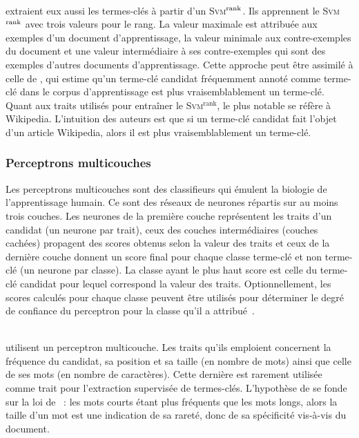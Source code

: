         ~\\ extraient eux aussi les termes-clés à
        partir d'un \textsc{Svm}$^\textnormal{rank}$. Ils apprennent le
        \textsc{Svm}$^\textnormal{rank}$ avec trois valeurs pour le rang. La
        valeur maximale est attribuée aux exemples d'un document
        d'apprentissage, la valeur minimale aux contre-exemples du document et
        une valeur intermédiaire à ses contre-exemples qui sont des exemples
        d'autres documents d'apprentissage. Cette approche peut être assimilé à
        celle de , qui estime qu'un terme-clé
        candidat fréquemment annoté comme terme-clé dans le corpus
        d'apprentissage est plus vraisemblablement un terme-clé. Quant aux
        traits utilisés pour entraîner le \textsc{Svm}$^\text{rank}$, le plus
        notable se réfère à Wikipedia. L'intuition des auteurs est que si un
        terme-clé candidat fait l'objet d'un article Wikipedia, alors il est
        plus vraisemblablement un terme-clé.

      \subsubsection{Perceptrons multicouches}
      \label{subsubsec:main-state_of_the_art-automatic_keyphrase_extraction-supervised_keyphrase_extraction-neural_network}
        Les perceptrons multicouches sont des classifieurs qui émulent la
        biologie de l'apprentissage humain. Ce sont des réseaux de neurones
        répartis sur au moins trois couches. Les neurones de la première couche
        représentent les traits d'un candidat (un neurone par trait), ceux des
        couches intermédiaires (couches cachées) propagent des scores obtenus
        selon la valeur des traits et ceux de la dernière couche donnent un
        score final pour chaque classe \og{}terme-clé\fg{} et \og{}non
        terme-clé\fg{} (un neurone par classe). La classe ayant le plus haut
        score est celle du terme-clé candidat pour lequel correspond la valeur
        des traits. Optionnellement, les scores calculés pour chaque classe
        peuvent être utilisés pour déterminer le degré de confiance du
        perceptron pour la classe qu'il a
        attribué~\cite{denker1991neuralnetprobability}.
        
        ~\\ utilisent un perceptron
        multicouche. Les traits qu'ils emploient concernent la fréquence du
        candidat, sa position et sa taille (en nombre de mots) ainsi que celle
        de ses mots (en nombre de caractères). Cette dernière est rarement
        utilisée comme trait pour l'extraction supervisée de termes-clés.
        L'hypothèse de  se fonde sur la loi de
        ~: les mots courts étant plus fréquents que les
        mots longs, alors la taille d'un mot est une indication de sa rareté,
        donc de sa spécificité vis-à-vis du document.
        
